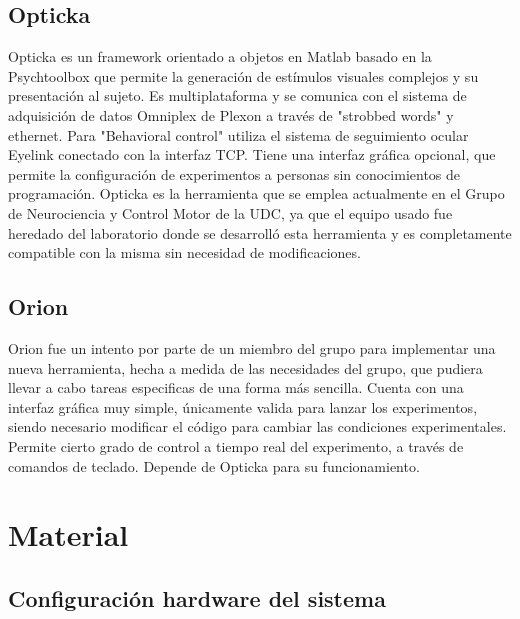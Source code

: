 \documentclass[conference]{IEEEtran}
\begin{document}
\subsection{Opticka}

Opticka\cite{opticka} es un framework orientado a objetos en Matlab basado en la Psychtoolbox que permite la generación de estímulos visuales complejos y su presentación al sujeto. Es multiplataforma y se comunica con el sistema de adquisición de datos Omniplex\cite{omniplex} de Plexon a través de "strobbed words" y ethernet. Para "Behavioral control" utiliza el sistema de seguimiento ocular Eyelink conectado con la interfaz TCP. 
Tiene una interfaz gráfica opcional, que permite la configuración de experimentos a personas sin conocimientos de programación.
Opticka es la herramienta que se emplea actualmente en el Grupo de Neurociencia y Control Motor de la UDC, ya que el equipo usado fue heredado del laboratorio donde se desarrolló esta herramienta y es completamente compatible con la misma sin necesidad de modificaciones.



\subsection{Orion}

Orion fue un intento por parte de un miembro del grupo para implementar una nueva herramienta, hecha a medida de las necesidades del grupo, que pudiera llevar a cabo tareas especificas de una forma más sencilla. Cuenta con una interfaz gráfica muy simple, únicamente valida para lanzar los experimentos, siendo necesario modificar el código para cambiar las condiciones experimentales. Permite cierto grado de control a tiempo real del experimento, a través de comandos de teclado.
Depende de Opticka para su funcionamiento.


\section{Material}

\subsection{Configuración hardware del sistema}
\end{document}
